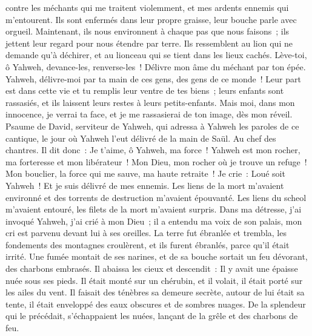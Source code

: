 \begin{multicols}{2}
contre les méchants qui me traitent violemment, et mes ardents ennemis qui m'entourent.
Ils sont enfermés dans leur propre graisse, leur bouche parle avec orgueil.
Maintenant, ils nous environnent à chaque pas que nous faisons~; ils jettent leur regard pour nous étendre par terre.
Ils ressemblent au lion qui ne demande qu'à déchirer, et au lionceau qui se tient dans les lieux cachés.
Lève-toi, ô Yahweh, devance-les, renverse-les~! Délivre mon âme du méchant par ton épée.
Yahweh, délivre-moi par ta main de ces gens, des gens de ce monde~! Leur part est dans cette vie et tu remplis leur ventre de tes biens~; leurs enfants sont rassasiés, et ils laissent leurs restes à leurs petits-enfants.
Mais moi, dans mon innocence, je verrai ta face, et je me rassasierai de ton image, dès mon réveil.
\VerseOne{}Psaume de David, serviteur de Yahweh, qui adressa à Yahweh les paroles de ce cantique, le jour où Yahweh l'eut délivré de la main de Saül. Au chef des chantres.
Il dit donc~: Je t'aime, ô Yahweh, ma force~!
Yahweh est mon rocher, ma forteresse et mon libérateur~! Mon Dieu, mon rocher où je trouve un refuge~! Mon bouclier, la force qui me sauve, ma haute retraite~!
Je crie~: Loué soit Yahweh~! Et je suis délivré de mes ennemis.
Les liens de la mort m'avaient environné et des torrents de destruction m'avaient épouvanté.
Les liens du scheol m'avaient entouré, les filets de la mort m'avaient surpris.
Dans ma détresse, j'ai invoqué Yahweh, j'ai crié à mon Dieu~; il a entendu ma voix de son palais, mon cri est parvenu devant lui à ses oreilles.
La terre fut ébranlée et trembla, les fondements des montagnes croulèrent, et ils furent ébranlés, parce qu'il était irrité.
Une fumée montait de ses narines, et de sa bouche sortait un feu dévorant, des charbons embrasés.
Il abaissa les cieux et descendit~: Il y avait une épaisse nuée sous ses pieds.
Il était monté sur un chérubin, et il volait, il était porté sur les ailes du vent.
Il faisait des ténèbres sa demeure secrète, autour de lui était sa tente, il était enveloppé des eaux obscures et de sombres nuages.
De la splendeur qui le précédait, s'échappaient les nuées, lançant de la grêle et des charbons de feu.

\end{multicols}
